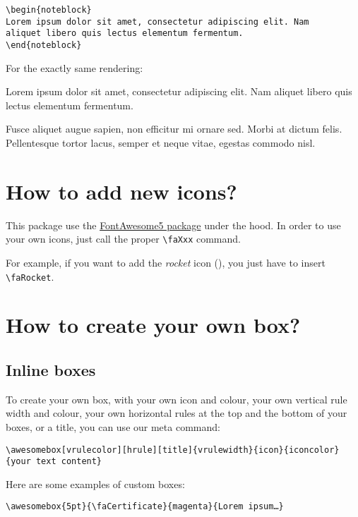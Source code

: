 \documentclass[a4paper,12pt]{article}
\newcommand\hrefcolor[2]{\textcolor{magenta}{\href{#1}{#2}}}
\begin{document}
\begin{verbatim}
\begin{noteblock}
Lorem ipsum dolor sit amet, consectetur adipiscing elit. Nam
aliquet libero quis lectus elementum fermentum.
\end{noteblock}
\end{verbatim}


For the exactly same rendering:

\begin{noteblock}
  Lorem ipsum dolor sit amet, consectetur adipiscing elit. Nam aliquet
  libero quis lectus elementum fermentum.

  Fusce aliquet augue sapien, non efficitur mi ornare sed. Morbi at
  dictum felis. Pellentesque tortor lacus, semper et neque vitae,
  egestas commodo nisl.
\end{noteblock}

\section{How to add new icons?}
\label{sec:new-icons}

This package use the
\hrefcolor{https://www.ctan.org/pkg/fontawesome5}{FontAwesome5 package}
under the hood. In order to use your own icons, just call the proper
\verb!\faXxx! command.

For example, if you want to add the \emph{rocket} icon
(\faRocket), you just have to  insert \verb!\faRocket!.

\section{How to create your own box?}
\label{sec:howtoown}
\subsection{Inline boxes}

To create your own box, with your own icon and colour, your own
vertical rule width and colour, your own horizontal rules at the top
and the bottom of your boxes, or a title, you can use our meta
command:

\begin{center}
\verb!\awesomebox[vrulecolor][hrule][title]{vrulewidth}{icon}{iconcolor}{your text content}!
\end{center}

Here are some examples of custom boxes:

\begin{center}
\verb!\awesomebox{5pt}{\faCertificate}{magenta}{Lorem ipsum…}!
\end{center}
\end{document}

